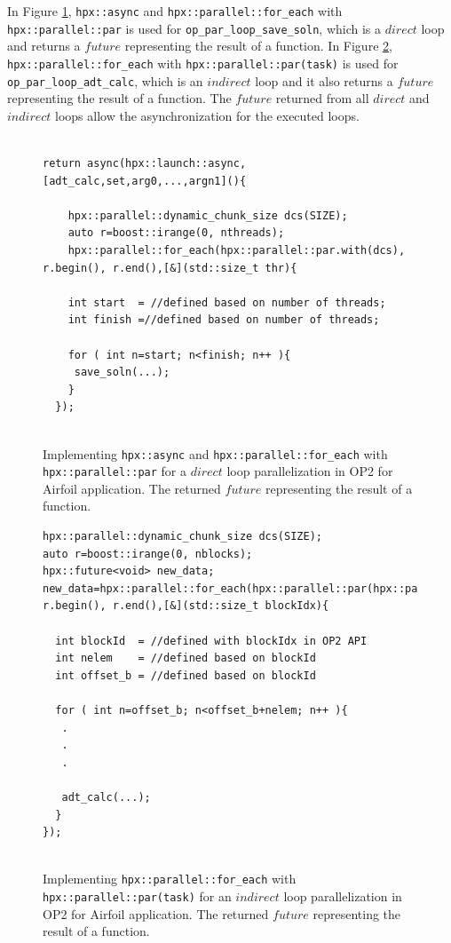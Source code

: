 \documentclass[conference]{IEEEtran}
\begin{document}
In Figure \ref{l6}, \texttt{hpx::async} and \texttt{hpx::parallel::for\_each} with \texttt{hpx::parallel::par} is used for \texttt{op\_par\_loop\_save\_soln}, which is a $direct$ loop and returns a $future$ representing the result of a function. In Figure \ref{l6b},  \texttt{hpx::parallel::for\_each} with \texttt{hpx::parallel::par(task)} is used for \texttt{op\_par\_loop\_adt\_calc}, which is an $indirect$ loop and it also returns a $future$ representing the result of a function. The $future$ returned from all $direct$ and $indirect$ loops allow the asynchronization for the executed loops.

\begin{figure} 
    \begin{lstlisting}    

return async(hpx::launch::async,[adt_calc,set,arg0,...,argn1](){

    hpx::parallel::dynamic_chunk_size dcs(SIZE);
    auto r=boost::irange(0, nthreads);
    hpx::parallel::for_each(hpx::parallel::par.with(dcs), r.begin(), r.end(),[&](std::size_t thr){
  
    int start  = //defined based on number of threads;
    int finish =//defined based on number of threads;
        
    for ( int n=start; n<finish; n++ ){
     save_soln(...);
    }
  });
  
    \end{lstlisting}
    \caption{\small{Implementing \texttt{hpx::async} and \texttt{hpx::parallel::for\_each} with \texttt{hpx::parallel::par} for a $direct$ loop parallelization in OP2 for Airfoil application. The returned $future$ representing the result of a function.}}
    \label{l6}
\end{figure}


\begin{figure} 
    \begin{lstlisting}    
hpx::parallel::dynamic_chunk_size dcs(SIZE);
auto r=boost::irange(0, nblocks);
hpx::future<void> new_data;
new_data=hpx::parallel::for_each(hpx::parallel::par(hpx::parallel::task).with(dcs), r.begin(), r.end(),[&](std::size_t blockIdx){
  
  int blockId  = //defined with blockIdx in OP2 API
  int nelem    = //defined based on blockId 
  int offset_b = //defined based on blockId
        
  for ( int n=offset_b; n<offset_b+nelem; n++ ){
   .
   .
   .

   adt_calc(...);
  }
});
  
    \end{lstlisting}
    \caption{\small{Implementing \texttt{hpx::parallel::for\_each} with \texttt{hpx::parallel::par(task)} for an $indirect$ loop parallelization in OP2 for Airfoil application. The returned $future$ representing the result of a function.}}
    \label{l6b}
\end{figure}
\end{document}
